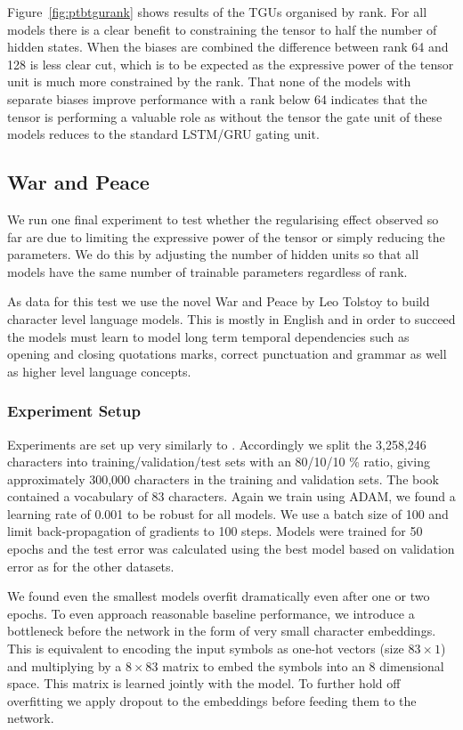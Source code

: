 Figure~\ref{fig:ptbtgurank} shows results of the TGUs organised by rank. For all models there
is a clear benefit to constraining the tensor to half the number of hidden states. When the biases
are combined the difference between rank 64 and 128 is less clear cut, which is to be expected as
the expressive power of the tensor unit is much more constrained by the rank. That none of the models
with separate biases improve performance with a rank below 64 indicates that the tensor is performing
a valuable role as without the tensor the gate unit of these models reduces to the standard
LSTM/GRU gating unit.


\subsection{War and Peace}
We run one final experiment to test whether the regularising effect
observed so far are due to limiting the expressive power of the tensor
or simply reducing the parameters. We do this by adjusting the number of hidden units so that
all models have the same number of trainable parameters regardless of rank.

As data for this test we use the novel War and Peace by Leo Tolstoy to build character level language
models. This is mostly in English and in order to succeed the models must learn to model long term
temporal dependencies such as opening and closing quotations marks, correct punctuation and grammar
as well as higher level language concepts.

\subsubsection{Experiment Setup}
Experiments are set up very similarly to \autocite{Karpathy2016}. Accordingly we split the 3,258,246
characters into training/validation/test sets with an 80/10/10 \% ratio, giving approximately
300,000 characters in the training and validation sets. The book contained a vocabulary of 83 characters.
Again we train using ADAM, we found a learning rate of 0.001 to be robust for all models. We use a
batch size of 100 and limit back-propagation of gradients to 100 steps. Models were trained for
50 epochs and the test error was calculated using the best model based on validation error as for the
other datasets.

We found even the smallest models overfit dramatically even after one or two epochs. To even approach
reasonable baseline performance, we introduce a bottleneck before the network in the form of very
small character embeddings. This is equivalent to encoding the input symbols as one-hot vectors
(size \(83 \times 1\)) and multiplying by a \(8 \times 83\) matrix to embed the symbols into an
8 dimensional space. This matrix is learned jointly with the model. To further hold off overfitting
we apply dropout \autocite{Srivastava2014} to the embeddings before feeding them to the network.


